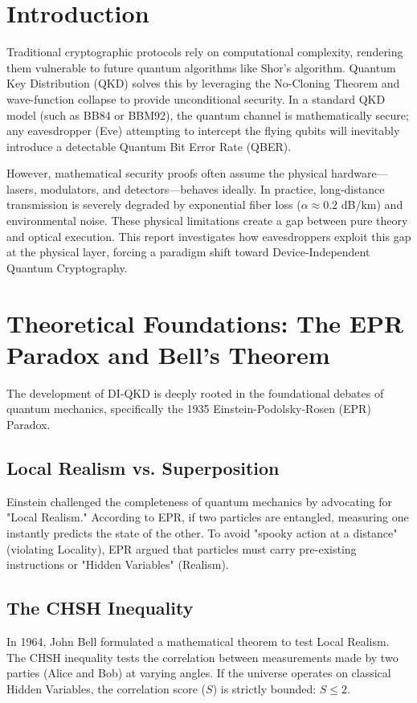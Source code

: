 \section{Introduction}
Traditional cryptographic protocols rely on computational complexity, rendering them vulnerable to future quantum algorithms like Shor’s algorithm. Quantum Key Distribution (QKD) solves this by leveraging the No-Cloning Theorem and wave-function collapse to provide unconditional security. In a standard QKD model (such as BB84 or BBM92), the quantum channel is mathematically secure; any eavesdropper (Eve) attempting to intercept the flying qubits will inevitably introduce a detectable Quantum Bit Error Rate (QBER).

However, mathematical security proofs often assume the physical hardware—lasers, modulators, and detectors—behaves ideally. In practice, long-distance transmission is severely degraded by exponential fiber loss ($\alpha \approx 0.2$ dB/km) and environmental noise. These physical limitations create a gap between pure theory and optical execution. This report investigates how eavesdroppers exploit this gap at the physical layer, forcing a paradigm shift toward Device-Independent Quantum Cryptography.

\section{Theoretical Foundations: The EPR Paradox and Bell’s Theorem}
The development of DI-QKD is deeply rooted in the foundational debates of quantum mechanics, specifically the 1935 Einstein-Podolsky-Rosen (EPR) Paradox.

\subsection{Local Realism vs. Superposition}
Einstein challenged the completeness of quantum mechanics by advocating for "Local Realism." According to EPR, if two particles are entangled, measuring one instantly predicts the state of the other. To avoid "spooky action at a distance" (violating Locality), EPR argued that particles must carry pre-existing instructions or "Hidden Variables" (Realism).

\subsection{The CHSH Inequality}
In 1964, John Bell formulated a mathematical theorem to test Local Realism. The CHSH inequality tests the correlation between measurements made by two parties (Alice and Bob) at varying angles. If the universe operates on classical Hidden Variables, the correlation score ($S$) is strictly bounded: $S \le 2$. 

